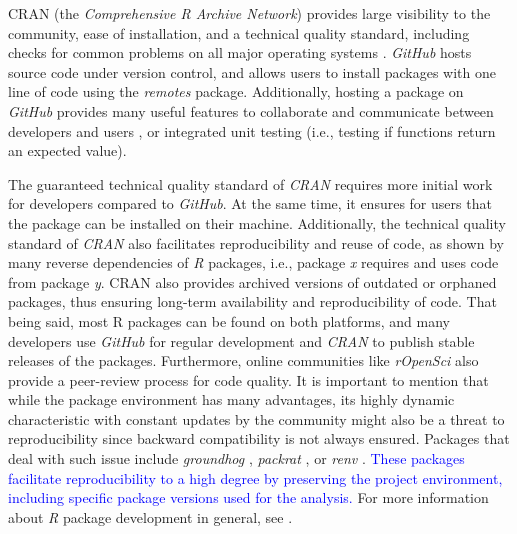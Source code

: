 \documentclass[smallextended]{svjour3}       %
\begin{document}
CRAN (the \textit{Comprehensive R Archive Network}) provides large visibility to the community, ease of installation, and a technical quality standard, including checks for common problems on all major operating systems \cite{Wickham2015}.
\textit{GitHub} hosts source code under version control, and allows users to install packages with one line of code using the \textit{remotes} \cite{Hester2020} package.
Additionally, hosting a package on \textit{GitHub} provides many useful features to collaborate and communicate between developers and users \cite{Wickham2015}, or integrated unit testing (i.e., testing if functions return an expected value).

The guaranteed technical quality standard of \textit{CRAN} requires more initial work for developers compared to \textit{GitHub}.
At the same time, it ensures for users that the package can be installed on their machine.
Additionally, the technical quality standard of \textit{CRAN} also facilitates reproducibility and reuse of code, as shown by many reverse dependencies of \textit{R} packages, i.e., package \textit{x} requires and uses code from package \textit{y}.
CRAN also provides archived versions of outdated or orphaned packages, thus ensuring long-term availability and reproducibility of code.
That being said, most R packages can be found on both platforms, and many developers use \textit{GitHub} for regular development and \textit{CRAN} to publish stable releases of the packages.
Furthermore, online communities like \textit{rOpenSci} also provide a peer-review process for code quality.
It is important to mention that while the package environment has many advantages, its highly dynamic characteristic with constant updates by the community might also be a threat to reproducibility since backward compatibility is not always ensured.
Packages that deal with such issue include \textit{groundhog} \cite{Simonsohn2021}, \textit{packrat} \cite{Ushey2018}, or \textit{renv} \cite{Ushey2020}.
\textcolor{blue}{These packages facilitate reproducibility to a high degree by preserving the project environment, including specific package versions used for the analysis.}
For more information about \textit{R} package development in general, see \cite{Wickham2015}.
\end{document}

